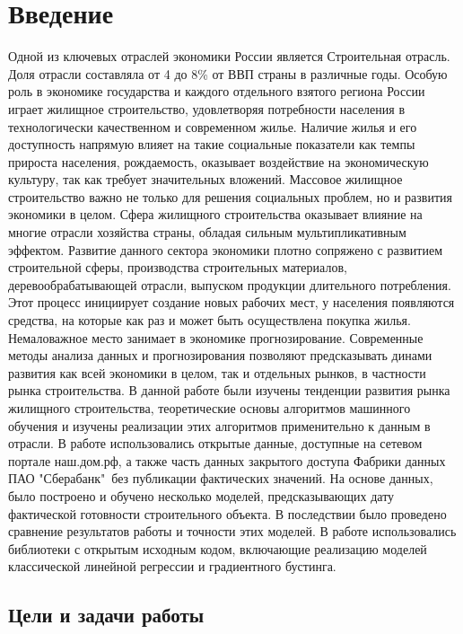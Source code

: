 \documentclass[12pt,a4paper]{article} %
\begin{document}
\newpage
\tableofcontents
 


\newpage
\section{Введение}

Одной из ключевых отраслей экономики России является Строительная отрасль. Доля отрасли составляла от 4 до 8\%  от ВВП страны в различные годы. Особую роль в экономике государства и каждого отдельного взятого региона России играет жилищное строительство, удовлетворяя потребности населения в технологически качественном и современном жилье. Наличие жилья и его доступность напрямую влияет на такие социальные показатели как темпы прироста населения, рождаемость, оказывает воздействие на экономическую культуру, так как требует значительных вложений. Массовое жилищное строительство важно не только для решения социальных проблем, но и развития экономики в целом. Сфера жилищного строительства оказывает влияние на многие отрасли хозяйства страны, обладая сильным мультипликативным эффектом. Развитие данного сектора экономики плотно сопряжено с развитием строительной сферы, производства строительных материалов, деревообрабатывающей отрасли, выпуском продукции длительного потребления. Этот процесс инициирует создание новых рабочих мест, у населения появляются средства, на которые как раз и может быть осуществлена покупка жилья. 
Немаловажное место занимает в экономике прогнозирование. Современные методы анализа данных и прогнозирования позволяют предсказывать динами развития как всей экономики в целом, так и отдельных рынков, в частности рынка строительства. В данной работе были изучены тенденции развития рынка жилищного строительства, теоретические основы алгоритмов машинного обучения и изучены реализации этих алгоритмов применительно к  данным в отрасли. В работе использовались открытые данные, доступные на сетевом портале наш.дом.рф, а также часть данных закрытого доступа Фабрики данных ПАО "Сберабанк"\ без публикации фактических значений. На основе данных, было построено и обучено несколько моделей, предсказывающих дату фактической готовности строительного объекта. В последствии было проведено сравнение результатов работы и точности этих моделей. В работе использовались библиотеки с открытым исходным кодом, включающие реализацию моделей классической линейной регрессии и градиентного бустинга.

\newpage
\subsection{Цели и задачи работы}
\end{document}
